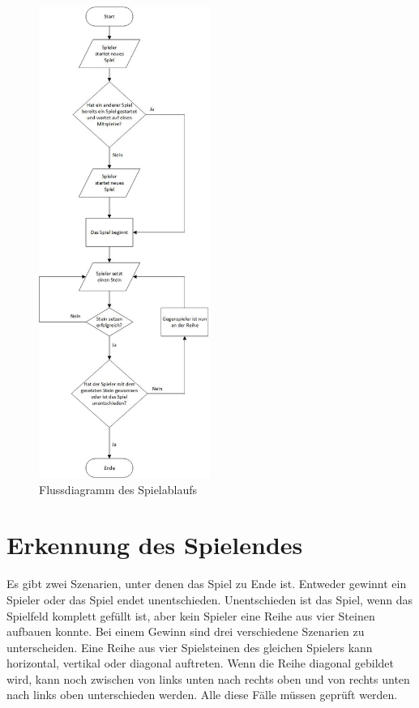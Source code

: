 \begin{figure}[H]
\centering
\includegraphics[width=0.5\textwidth]{images/spiellogik.jpg}
\caption{Flussdiagramm des Spielablaufs}
\end{figure}

\section{Erkennung des Spielendes}\label{sec:GameOver}
Es gibt zwei Szenarien, unter denen das Spiel zu Ende ist. Entweder gewinnt ein Spieler oder das Spiel endet unentschieden. Unentschieden ist das Spiel, wenn das Spielfeld komplett gefüllt ist, aber kein Spieler eine Reihe aus vier Steinen aufbauen konnte.
Bei einem Gewinn sind drei verschiedene Szenarien zu unterscheiden. Eine Reihe aus vier Spielsteinen des gleichen Spielers kann horizontal, vertikal oder diagonal auftreten. Wenn die Reihe diagonal gebildet wird, kann noch zwischen von links unten nach rechts oben und von rechts unten nach links oben unterschieden werden. Alle diese Fälle müssen geprüft werden.

